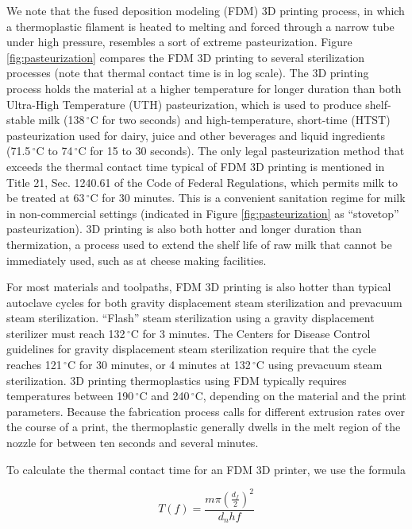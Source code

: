 \begin{refsection}
We note that the fused deposition modeling (FDM) 3D printing process,
in which a thermoplastic filament is heated to melting and forced
through a narrow tube under high pressure, resembles a sort of extreme
pasteurization. Figure \ref{fig:pasteurization} compares the FDM 3D
printing to several sterilization processes (note that thermal contact
time is in log scale). The 3D printing process holds the material at a
higher temperature for longer duration than both Ultra-High
Temperature (UTH) pasteurization, which is used to produce
shelf-stable milk (138$\,^{\circ}\mathrm{C}$ for two seconds) and
high-temperature, short-time (HTST) pasteurization used for dairy,
juice and other beverages and liquid ingredients
(71.5$\,^{\circ}\mathrm{C}$ to 74$\,^{\circ}\mathrm{C}$ for 15 to 30
seconds). The only legal pasteurization method that exceeds the
thermal contact time typical of FDM 3D printing is mentioned in Title
21, Sec. 1240.61 of the Code of Federal Regulations, which permits
milk to be treated at 63$\,^{\circ}\mathrm{C}$ for 30 minutes. This is
a convenient sanitation regime for milk in non-commercial settings
(indicated in Figure \ref{fig:pasteurization} as ``stovetop''
pasteurization). 3D printing is also both hotter and longer duration
than thermization, a process used to extend the shelf life of raw milk
that cannot be immediately used, such as at cheese making facilities.

For most materials and toolpaths, FDM 3D printing is also hotter than typical
autoclave cycles for both gravity displacement steam sterilization and
prevacuum steam sterilization. ``Flash'' steam sterilization using a gravity
displacement sterilizer must reach 132$\,^{\circ}\mathrm{C}$ for 3 minutes.
The Centers for Disease Control guidelines for gravity displacement steam
sterilization require that the cycle reaches 121$\,^{\circ}\mathrm{C}$ for 30
minutes, or 4 minutes at 132$\,^{\circ}\mathrm{C}$ using prevacuum steam
sterilization. 3D printing thermoplastics using FDM typically requires
temperatures between 190$\,^{\circ}\mathrm{C}$ and 240$\,^{\circ}\mathrm{C}$,
depending on the material and the print parameters. Because the fabrication
process calls for different  extrusion rates over the course of a print, the
thermoplastic  generally dwells in the melt region of the nozzle for between
ten seconds and several minutes.

To calculate the thermal contact time for an FDM 3D printer, we use the
formula

\begin{equation}
T(f) = \frac{m \pi \left(\frac{d_f}{2}\right)^2}{ d_n h f }
\end{equation}


\end{refsection}
